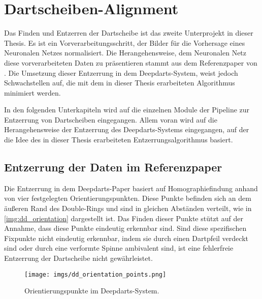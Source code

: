 
\section{Dartscheiben-Alignment}
\label{sec:impl:cv}

Das Finden und Entzerren der Dartscheibe ist das zweite Unterprojekt in dieser Thesis. Es ist ein Vorverarbeitungsschritt, der Bilder für die Vorhersage eines Neuronalen Netzes normalisiert. Die Herangehensweise, dem Neuronalen Netz diese vorverarbeiteten Daten zu präsentieren stammt aus dem Referenzpaper von \citeauthor{deepdarts} \cite{deepdarts}. Die Umsetzung dieser Entzerrung in dem Deepdarts-System, weist jedoch Schwachstellen auf, die mit dem in dieser Thesis erarbeiteten Algorithmus minimiert werden.

In den folgenden Unterkapiteln wird auf die einzelnen Module der Pipeline zur Entzerrung von Dartscheiben eingegangen. Allem voran wird auf die Herangehensweise der Entzerrung des Deepdarts-Systems eingegangen, auf der die Idee des in dieser Thesis erarbeiteten Entzerrungsalgorithmus basiert.

\subsection{Entzerrung der Daten im Referenzpaper}
\label{sec:impl:cv:paper}

Die Entzerrung in dem Deepdarts-Paper basiert auf Homographiefindung anhand von vier festgelegten Orientierungspunkten. Diese Punkte befinden sich an dem äußeren Rand des Double-Rings und sind in gleichen Abständen verteilt, wie in \autoref{img:dd_orientation} dargestellt ist. Das Finden dieser Punkte stützt auf der Annahme, dass diese Punkte eindeutig erkennbar sind. Sind diese spezifischen Fixpunkte nicht eindeutig erkennbar, indem sie durch einen Dartpfeil verdeckt sind oder durch eine verformte Spinne ambivalent sind, ist eine fehlerfreie Entzerrung der Dartscheibe nicht gewährleistet.

\begin{figure}
    \centering
    \texttt{[image: imgs/dd\_orientation\_points.png]}
    \caption{Orientierungspunkte im Deepdarts-System. \cite{deepdarts}}
    \label{img:dd_orientation}
\end{figure}

